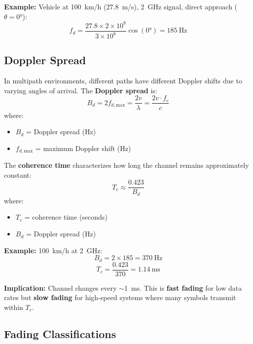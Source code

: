 \textbf{Example:} Vehicle at 100~km/h (27.8~m/s), 2~GHz signal, direct approach ($\theta = 0°$):
\begin{equation}
f_d = \frac{27.8 \times 2 \times 10^9}{3 \times 10^8} \cos(0°) = 185~\text{Hz}
\end{equation}

\subsection{Doppler Spread}

In multipath environments, different paths have different Doppler shifts due to varying angles of arrival. The \textbf{Doppler spread} is:
\begin{equation}
B_d = 2f_{d,\text{max}} = \frac{2v}{\lambda} = \frac{2v \cdot f_c}{c}
\end{equation}
where:
\begin{itemize}
\item $B_d$ = Doppler spread (Hz)
\item $f_{d,\text{max}}$ = maximum Doppler shift (Hz)
\end{itemize}

The \textbf{coherence time} characterizes how long the channel remains approximately constant:
\begin{equation}
T_c \approx \frac{0.423}{B_d}
\end{equation}
where:
\begin{itemize}
\item $T_c$ = coherence time (seconds)
\item $B_d$ = Doppler spread (Hz)
\end{itemize}

\textbf{Example:} 100~km/h at 2~GHz:
\begin{equation}
B_d = 2 \times 185 = 370~\text{Hz}
\end{equation}
\begin{equation}
T_c = \frac{0.423}{370} = 1.14~\text{ms}
\end{equation}

\textbf{Implication:} Channel changes every $\sim$1~ms. This is \textbf{fast fading} for low data rates but \textbf{slow fading} for high-speed systems where many symbols transmit within $T_c$.

\subsection{Fading Classifications}\label{fading-classifications}

